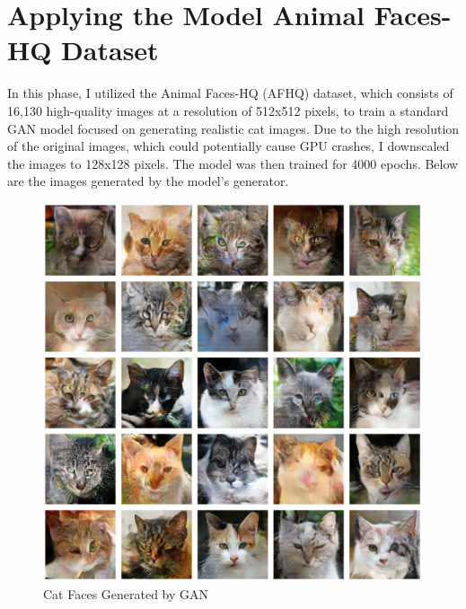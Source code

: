 \section{Applying the Model Animal Faces-HQ Dataset}
In this phase, I utilized the Animal Faces-HQ (AFHQ) dataset, which consists of 16,130 high-quality 
images at a resolution of 512x512 pixels, to train a standard GAN model focused on generating realistic 
cat images. Due to the high resolution of the original images, which could potentially cause GPU crashes, 
I downscaled the images to 128x128 pixels. The model was then trained for 4000 epochs. Below are the images 
generated by the model’s generator.


\begin{figure}[h]
    \centering
    \includegraphics[width=1.0\textwidth]{./Images/apply_new_dataset.jpg} 
    \caption{Cat Faces Generated by GAN}
    \label{fig:apply new dataset}
\end{figure}
